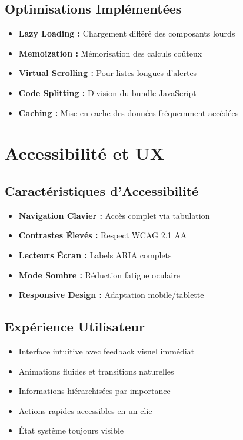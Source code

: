 \documentclass[a4paper,12pt]{article}
\begin{document}
\subsection{Optimisations Implémentées}

\begin{itemize}
    \item \textbf{Lazy Loading :} Chargement différé des composants lourds
    \item \textbf{Memoization :} Mémorisation des calculs coûteux
    \item \textbf{Virtual Scrolling :} Pour listes longues d'alertes
    \item \textbf{Code Splitting :} Division du bundle JavaScript
    \item \textbf{Caching :} Mise en cache des données fréquemment accédées
\end{itemize}

\section{Accessibilité et UX}

\subsection{Caractéristiques d'Accessibilité}

\begin{itemize}
    \item \textbf{Navigation Clavier :} Accès complet via tabulation
    \item \textbf{Contrastes Élevés :} Respect WCAG 2.1 AA
    \item \textbf{Lecteurs Écran :} Labels ARIA complets
    \item \textbf{Mode Sombre :} Réduction fatigue oculaire
    \item \textbf{Responsive Design :} Adaptation mobile/tablette
\end{itemize}

\subsection{Expérience Utilisateur}

\begin{tcolorbox}[colback=primaryblue!10, colframe=primaryblue, title={\faIcon{user-circle} UX Design}]
\begin{itemize}
    \item Interface intuitive avec feedback visuel immédiat
    \item Animations fluides et transitions naturelles
    \item Informations hiérarchisées par importance
    \item Actions rapides accessibles en un clic
    \item État système toujours visible
\end{itemize}
\end{tcolorbox}
\end{document}
